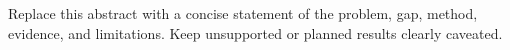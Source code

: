 Replace this abstract with a concise statement of the problem, gap, method, evidence, and limitations. Keep unsupported or planned results clearly caveated.
